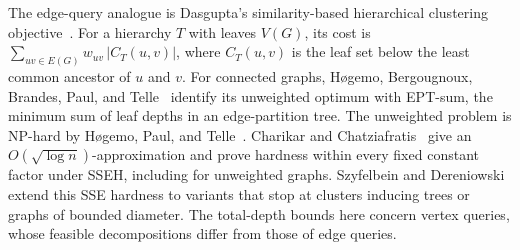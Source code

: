 The edge-query analogue is Dasgupta's similarity-based hierarchical
clustering objective~\cite{Dasgupta2016}. For a hierarchy $T$ with
leaves $V(G)$, its cost is
$\sum_{uv\in E(G)}w_{uv}\,|C_T(u,v)|$,
where $C_T(u,v)$ is the leaf set below the least common ancestor
of $u$ and $v$. For connected graphs, H\o gemo, Bergougnoux, Brandes,
Paul, and Telle~\cite[Theorem~6]{HogemoEtAl2021} identify its
unweighted optimum with EPT-sum, the minimum sum of leaf depths in an
edge-partition tree. The unweighted problem
is NP-hard by H\o gemo, Paul, and
Telle~\cite{HogemoPaulTelle2020}. Charikar and
Chatziafratis~\cite{CharikarChatziafratis2017} give an
$O(\sqrt{\log n})$-approximation and prove hardness within every
fixed constant factor under SSEH, including for unweighted graphs.
Szyfelbein and Dereniowski~\cite{SzyfelbeinDereniowski2026}
extend this SSE hardness to variants that stop at clusters inducing
trees or graphs of bounded diameter.
The total-depth bounds here concern vertex queries, whose feasible
decompositions differ from those of edge queries.

\clearpage

\clearpage
